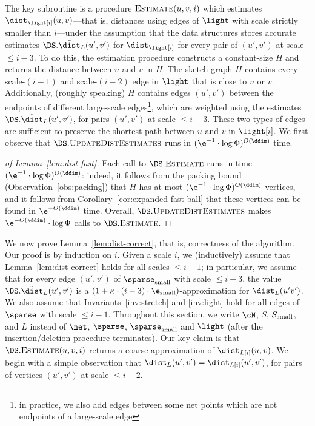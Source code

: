 %
The key subroutine is a procedure $\textsc{Estimate}(u,v,i)$ which estimates $\dist_{\light [i]}(u,v)$---that is, distances using edges of $\light$ with scale strictly smaller than $i$---under the assumption that the data structures stores accurate estimates $\DS.\tilde \dist_{L}(u',v')$ for $\dist_{\light [i]}$ for every pair of $(u',v')$ at scale $\le i - 3$.
To do this, the estimation procedure constructs a constant-size  $H$ and returns the distance between $u$ and $v$ in $H$. The sketch graph $H$ contains every scale-$(i-1)$ and scale-$(i-2)$ edge in $\light$ that is close to $u$ or $v$. Additionally, (roughly speaking) $H$ contains edges $(u',v')$ between the endpoints of different large-scale edges\footnote{in practice, we also add edges between some net points which are not endpoints of a large-scale edge}, which are weighted using the estimates $\DS.\tilde \dist_L(u',v')$, for pairs $(u',v')$ at scale $\le i - 3$. These two types of edges are sufficient to preserve the shortest path between $u$ and $v$ in $\light [i]$.
% 
% 
% 
We first observe that $\DS.\textsc{UpdateDistEstimates}$ runs in $(\e^{-1} \cdot \log \Phi)^{O(\ddim)}$ time.
\begin{proof}[of Lemma~\ref{lem:dist-fast}]
    Each call to $\DS.\textsc{Estimate}$ runs in time $(\e^{-1} \cdot \log \Phi)^{O(\ddim)}$: indeed, it follows from the packing bound (Observation~\ref{obs:packing}) that $H$ has at most $(\e^{-1} \cdot\log \Phi)^{O(\ddim)}$ vertices, and it follows from Corollary~\ref{cor:expanded-fast-ball} that these vertices can be found in $\e^{-O(\ddim)}$ time. Overall, $\DS.\textsc{UpdateDistEstimates}$ makes $\e^{-O(\ddim)} \cdot \log \Phi$ calls to $\DS.\textsc{Estimate}$.
\end{proof}
%
We now prove Lemma~\ref{lem:dist-correct}, that is, correctness of the algorithm.
% 
Our proof is by induction on $i$. Given a scale $i$, we (inductively) assume that Lemma~\ref{lem:dist-correct} holds for all scales $\le i-1$; in particular, we assume that for every edge $(u',v')$ of $\sparse_{\rm small}$ with scale $\le i -3$, the value $\DS.\tilde \dist_L(u',v')$ is a $(1 + \kappa \cdot(i-3) \cdot\e_{\rm small})$-approximation for $\dist_L(u'v')$. We also assume that Invariants~\ref{inv:stretch} and \ref{inv:light} hold for all edges of $\sparse$ with scale $\le i-1$.
% 
Throughout this section, we write $\cN$, $S$, $S_{\rm small}$, and $L$ instead of $\net$, $\sparse$, $\sparse_{\rm small}$ and $\light$ (after the insertion/deletion procedure terminates).
% 
% 
Our key claim is that $\DS.\textsc{Estimate}(u,v,i)$ returns a coarse approximation of $\dist_{L[i]}(u,v)$. We begin with a simple observation that $\dist_{L}(u',v') = \dist_{L[i]}(u',v')$, for pairs of vertices $(u',v')$ at scale $\le i - 2$.
